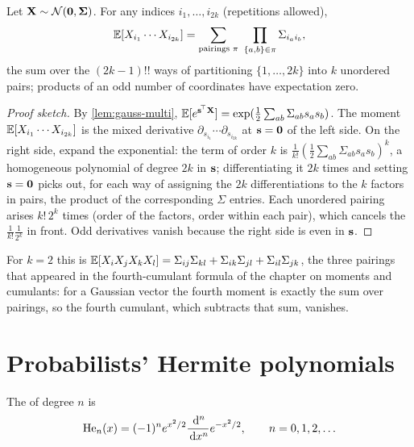 \begin{theorem}[Isserlis]
\label{thm:isserlis}
Let $\mathbf{X}\sim\mathcal{N}\!\left(\mathbf{0},\mathbf{\Sigma}\right)$. For any indices $i_1,\dots,i_{2k}$ (repetitions
allowed),
\begin{equation}
  \E[X_{i_1}\cdots X_{i_{2k}}]=\sum_{\text{pairings }\pi}\ \prod_{\{a,b\}\in\pi}\Sigma_{i_ai_b},
  \label{eq:isserlis}
\end{equation}
the sum over the $(2k-1)!!$ ways of partitioning $\{1,\dots,2k\}$ into $k$ unordered
pairs; products of an odd number of coordinates have expectation zero.
\end{theorem}
\begin{proof}[Proof sketch]
By \cref{lem:gauss-multi}, $\mathbb{E}[e^{\mathbf{s}^{\!\top}\mathbf{X}}]=\exp(\tfrac12\sum_{ab}\Sigma_{ab}s_as_b)$.
The moment $\mathbb{E}[X_{i_1}\cdots X_{i_{2k}}]$ is the mixed derivative
$\partial_{s_{i_1}}\cdots\partial_{s_{i_{2k}}}$ at $\mathbf{s}=\mathbf{0}$ of the left side.
On the right side, expand the exponential: the term of order $k$ is
$\tfrac1{k!}(\tfrac12\sum_{ab}\Sigma_{ab}s_as_b)^k$, a homogeneous polynomial of degree
$2k$ in $\mathbf{s}$; differentiating it $2k$ times and setting $\mathbf{s}=\mathbf{0}$ picks out,
for each way of assigning the $2k$ differentiations to the $k$ factors in pairs, the
product of the corresponding $\Sigma$ entries. Each unordered pairing arises
$k!\,2^k$ times (order of the factors, order within each pair), which cancels the
$\tfrac1{k!}\tfrac1{2^k}$ in front. Odd derivatives vanish because the right side is
even in $\mathbf{s}$.
\end{proof}

For $k=2$ this is $\mathbb{E}[X_iX_jX_kX_l]=\Sigma_{ij}\Sigma_{kl}+\Sigma_{ik}\Sigma_{jl}+\Sigma_{il}\Sigma_{jk}$,
the three pairings that appeared in the fourth-cumulant formula of the chapter on
moments and cumulants: for a Gaussian vector the fourth moment is exactly the sum over
pairings, so the fourth cumulant, which subtracts that sum, vanishes.

\section{Probabilists' Hermite polynomials}

\begin{definition}
The  of degree $n$ is
\begin{equation}
  \Hen{n}(x)=(-1)^ne^{x^2/2}\frac{\dd^n}{\dd x^n}e^{-x^2/2},\qquad n=0,1,2,\dots
  \label{eq:rodrigues}
\end{equation}
\end{definition}

